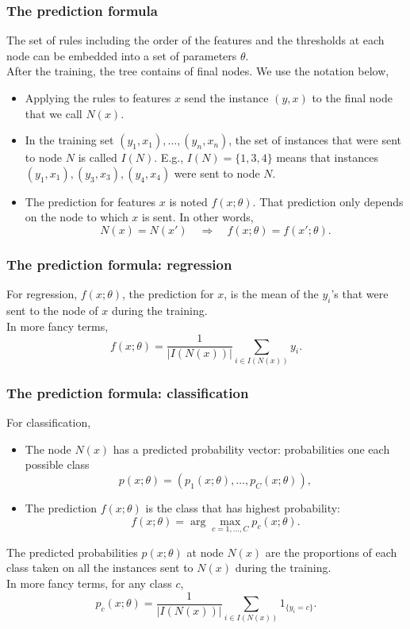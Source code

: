 \begin{frame}
\frametitle{The prediction formula}
The set of rules including the order of the features and the thresholds at each node can be embedded into a set of parameters $\theta$. \\
\vspace{0.3cm}
After the training, the tree contains of final nodes. We use the notation below,
\begin{itemize}
\item Applying the rules to features $x$ send the instance $(y,x)$ to the final node that we call $N(x)$.
\item In the training set $(y_1,x_1), \ldots, (y_n,x_n)$, the set of instances that were sent to node $N$ is called $I(N)$. E.g., $I(N)=\{1,3,4\}$ means that instances $(y_1,x_1),(y_3,x_3),(y_4,x_4)$ were sent to node $N$.
\item The prediction for features $x$ is noted $f(x;\theta)$. That prediction only depends on the node to which $x$ is sent. In other words,
$$
N(x) = N(x') \quad \Longrightarrow \quad f(x;\theta) = f(x';\theta).
$$ 
\end{itemize}
\end{frame}
\begin{frame}
\frametitle{The prediction formula: regression}
For regression, $f(x;\theta)$, the prediction for $x$, is the mean of the $y_i$'s that were sent to the node of $x$ during the training.\\
\vspace{0.3cm}
In more fancy terms, 
$$
f(x;\theta) = \frac{1}{|I(N(x))|}\sum_{i \in I(N(x))} y_i.
$$
\end{frame}
\begin{frame}
\frametitle{The prediction formula: classification}
For classification, 
\begin{itemize}
\item The node $N(x)$ has a predicted probability vector: probabilities one each possible class 
$$
p(x;\theta) = (p_1(x;\theta), \ldots, p_C(x;\theta)),
$$
\item The prediction $f(x;\theta)$ is the class that has highest probability:
$$
f(x;\theta) = \arg\max_{c=1,\ldots,C} p_c(x;\theta).
$$ 
\end{itemize}
The predicted probabilities $p(x;\theta)$ at node $N(x)$ are the proportions of each class taken on all the instances sent to $N(x)$ during the training.\\
\vspace{0.2cm}
In more fancy terms, for any class $c$,
$$
p_c(x;\theta) = \frac{1}{|I(N(x))|}\sum_{i \in I(N(x))} 1_{\{y_i = c\}}.
$$
\end{frame}
